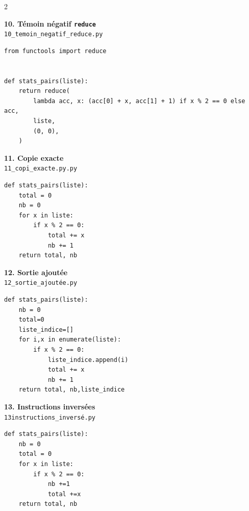 \documentclass[12pt,a4paper,oneside]{report}
\begin{document}
\begin{multicols}{2}
\noindent\begin{minipage}{\linewidth}
\textbf{10. Témoin négatif \texttt{reduce}}\\
{\footnotesize \texttt{10\_temoin\_negatif\_reduce.py}}
\begin{lstlisting}[style=pyncst, basicstyle=\ttfamily\scriptsize, breaklines=true]
from functools import reduce


def stats_pairs(liste):
    return reduce(
        lambda acc, x: (acc[0] + x, acc[1] + 1) if x % 2 == 0 else acc,
        liste,
        (0, 0),
    )
\end{lstlisting}
\end{minipage}
\medskip


\noindent\begin{minipage}{\linewidth}
\textbf{11. Copie exacte}\\
{\footnotesize \texttt{11\_copi\_exacte.py.py}}
\begin{lstlisting}[style=pyncst, basicstyle=\ttfamily\scriptsize, breaklines=true]
def stats_pairs(liste):
    total = 0
    nb = 0
    for x in liste:
        if x % 2 == 0:
            total += x
            nb += 1
    return total, nb
\end{lstlisting}
\end{minipage}
\medskip


\noindent\begin{minipage}{\linewidth}
\textbf{12. Sortie ajoutée}\\
{\footnotesize \texttt{12\_sortie\_ajoutée.py}}
\begin{lstlisting}[style=pyncst, basicstyle=\ttfamily\scriptsize, breaklines=true]
def stats_pairs(liste):
    nb = 0
    total=0
    liste_indice=[]
    for i,x in enumerate(liste):
        if x % 2 == 0:
            liste_indice.append(i)
            total += x
            nb += 1
    return total, nb,liste_indice
\end{lstlisting}
\end{minipage}
\medskip


\noindent\begin{minipage}{\linewidth}
\textbf{13. Instructions inversées}\\
{\footnotesize \texttt{13instructions\_inversé.py}}
\begin{lstlisting}[style=pyncst, basicstyle=\ttfamily\scriptsize, breaklines=true]
def stats_pairs(liste):
    nb = 0
    total = 0
    for x in liste:
        if x % 2 == 0:
            nb +=1
            total +=x
    return total, nb
\end{lstlisting}
\end{minipage}
\medskip
\end{multicols}
\end{document}
